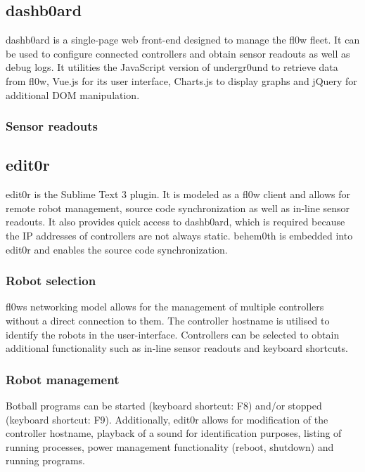 \documentclass[conference]{IEEEtran}
\begin{document}
\subsection{dashb0ard}
dashb0ard is a single-page web front-end designed to manage the fl0w fleet. It can be used to configure connected controllers and obtain sensor readouts as well as debug logs. It utilities the JavaScript version of undergr0und to retrieve data from fl0w, Vue.js for its user interface, Charts.js to display graphs and jQuery\cite{jQuery:jQuery Foundation} for additional DOM manipulation.

\subsubsection{Sensor readouts}


\subsection{edit0r}
edit0r is the Sublime Text 3 plugin. It is modeled as a fl0w client and allows for remote robot management, source code synchronization as well as in-line sensor readouts. It also provides quick access to dashb0ard, which is required because the IP addresses of controllers are not always static. behem0th\cite{behem0th:Christoph Heiss} is embedded into edit0r and enables the source code synchronization.

\subsubsection{Robot selection}
fl0ws networking model allows for the management of multiple controllers without a direct connection to them. The controller hostname is utilised to identify the robots in the user-interface. Controllers can be selected to obtain additional functionality such as in-line sensor readouts and keyboard shortcuts.

\subsubsection{Robot management}
Botball programs can be started (keyboard shortcut: F8) and/or stopped (keyboard shortcut: F9).
Additionally, edit0r allows for modification of the controller hostname, playback of a sound for identification purposes, listing of running processes, power management functionality (reboot, shutdown) and running programs.
\end{document}

